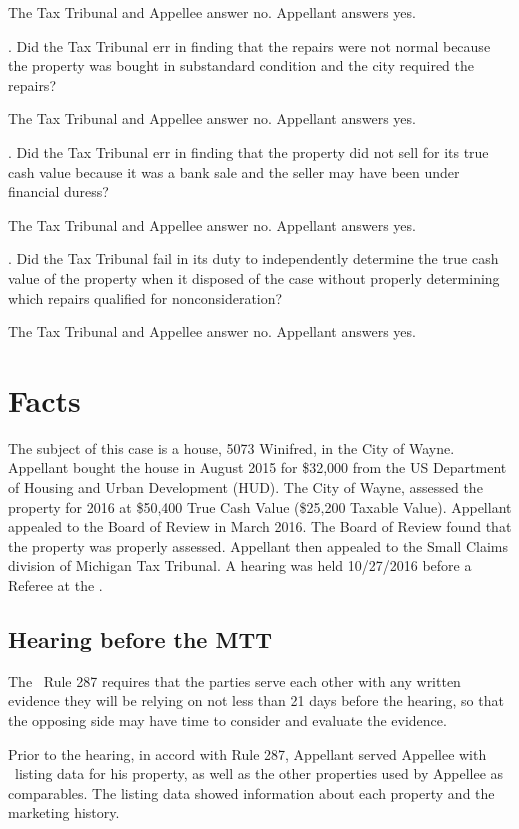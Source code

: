 \documentclass[12pt,\documentclassflag]{michiganCourtOfAppealsBrief}
\begin{document}
The Tax Tribunal and Appellee answer no. Appellant answers yes. 


. Did the Tax Tribunal err in finding that the repairs were not normal because the property was bought in substandard condition  and the city required the repairs?

The Tax Tribunal and Appellee answer no. Appellant answers yes.


. Did the Tax Tribunal err in finding that the property did not sell for its true cash value because it was a bank sale and the seller may have been under financial duress?

The Tax Tribunal and Appellee answer no. Appellant answers yes. 


. Did the Tax Tribunal fail in its duty to independently determine the true cash value of the property when it disposed of the case without properly determining which repairs qualified for nonconsideration?

The Tax Tribunal and Appellee answer no. Appellant answers yes.


\section{Facts}
The subject of this case is a house, 5073 Winifred, in the City of Wayne. Appellant bought the house in August 2015 for \$32,000 from the US Department of Housing and Urban Development (HUD). The City of Wayne, assessed the property for 2016 at \$50,400 True Cash Value (\$25,200 Taxable Value). Appellant appealed to the Board of Review in March 2016. The Board of Review found that the property was properly assessed. Appellant then appealed to the Small Claims division of Michigan Tax Tribunal. A hearing was held 10/27/2016 before a Referee at the \MTT.

\subsection{Hearing before the MTT}

The \MTT\ Rule 287 requires that the parties serve each other with any written evidence they will be relying on not less than 21 days before the hearing, so that the opposing side may have time to consider and evaluate the evidence.

Prior to the hearing, in accord with Rule 287, Appellant served Appellee with \MLS\ listing data for his property, as well as the other properties used by Appellee as comparables. The listing data showed information about each property and the marketing history. 
\end{document}
